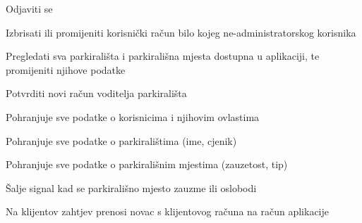 \begin{packed_enum}
\begin{packed_enum}
				\end{packed_enum}
			
				\item  {}
				
				\begin{packed_enum}
					
					\item Odjaviti se
					\item Izbrisati ili promijeniti korisnički račun bilo kojeg ne-administratorskog korisnika
					\item Pregledati sva parkirališta i parkirališna mjesta dostupna u aplikaciji, te promijeniti njihove podatke
					\item Potvrditi novi račun voditelja parkirališta
					
				\end{packed_enum}
			
				\item  {}
				
				\begin{packed_enum}
					
					\item Pohranjuje sve podatke o korisnicima i njihovim ovlastima
					\item Pohranjuje sve podatke o parkiralištima (ime, cjenik)
					\item Pohranjuje sve podatke o parkirališnim mjestima (zauzetost, tip)
					
				\end{packed_enum}
			
				\item  {}
				
				\begin{packed_enum}
					
					\item Šalje signal kad se parkirališno mjesto zauzme ili oslobodi
					
				\end{packed_enum}
			
				\item  {}
			
				\begin{packed_enum}
				
				\item Na klijentov zahtjev prenosi novac s klijentovog računa na račun aplikacije

				
			\end{packed_enum}
			\end{packed_enum}
			
